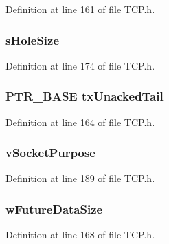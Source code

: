 Definition at line 161 of file T\+C\+P.\+h.

\hypertarget{struct_t_c_b_a343884e48d9a59f81266a9e5cd1cb0b2}{}
\subsubsection[{s\+Hole\+Size}]{ s\+Hole\+Size}\label{struct_t_c_b_a343884e48d9a59f81266a9e5cd1cb0b2}


Definition at line 174 of file T\+C\+P.\+h.

\hypertarget{struct_t_c_b_a6a6329eb22236074b0f6b501ef3fdedf}{}
\subsubsection[{tx\+Unacked\+Tail}]{\setlength{\rightskip}{0pt plus 5cm}P\+T\+R\+\_\+\+B\+A\+S\+E tx\+Unacked\+Tail}\label{struct_t_c_b_a6a6329eb22236074b0f6b501ef3fdedf}


Definition at line 164 of file T\+C\+P.\+h.

\hypertarget{struct_t_c_b_a2c590b42dac0ddfc5ec2e193261815c5}{}
\subsubsection[{v\+Socket\+Purpose}]{ v\+Socket\+Purpose}\label{struct_t_c_b_a2c590b42dac0ddfc5ec2e193261815c5}


Definition at line 189 of file T\+C\+P.\+h.

\hypertarget{struct_t_c_b_a48cb8cf682effdf9221fef77ae582298}{}
\subsubsection[{w\+Future\+Data\+Size}]{ w\+Future\+Data\+Size}\label{struct_t_c_b_a48cb8cf682effdf9221fef77ae582298}


Definition at line 168 of file T\+C\+P.\+h.

